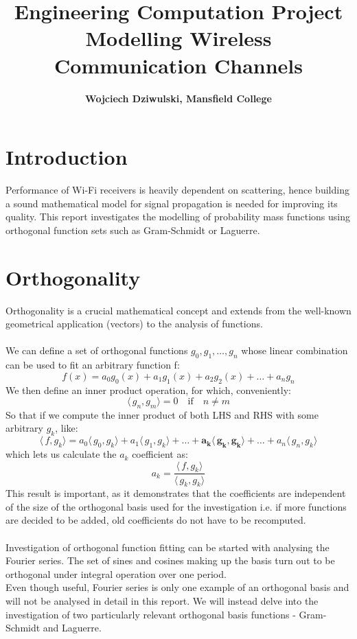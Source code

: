 \documentclass[a4paper]{article}
\title{Engineering Computation Project \\ \large Modelling Wireless Communication Channels}
\author{\textbf{Wojciech Dziwulski, Mansfield College}}
\date{}
\numberwithin{equation}{section}
\begin{document}
\maketitle

\section{Introduction}

Performance of Wi-Fi receivers is heavily dependent on scattering, hence building a sound mathematical model for signal propagation is needed for improving its quality. This report investigates the modelling of probability mass functions using orthogonal function sets such as Gram-Schmidt or Laguerre.

\section{Orthogonality}

Orthogonality is a crucial mathematical concept and extends from the well-known geometrical application (vectors) to the analysis of functions.
\\ \\
We can define a set of orthogonal functions $g_0, g_1, \ldots, g_n$ whose linear combination can be used to fit an arbitrary function f:
\begin{equation}f(x) = a_0 g_0(x)+a_1 g_1(x)+a_2 g_2(x)+\ldots+a_n g_n \end{equation}
\noindent We then define an inner product operation, for which, conveniently:
\begin{equation} \langle\,g_n,g_m\rangle = 0 \quad \textrm{if} \quad n \ne m \end{equation}
So that if we compute the inner product of both LHS and RHS with some arbitrary $g_k$, like:
\begin{equation} \langle\,f,g_k\rangle = a_0\langle\,g_0,g_k\rangle + a_1\langle\,g_1,g_k\rangle + \ldots + \boldsymbol{a_k\langle\,g_k,g_k\rangle} + \ldots + a_n\langle\,g_n,g_k\rangle \end{equation}
which lets us calculate the $a_k$ coefficient as:
\begin{equation} a_k = \frac {\langle\,f,g_k\rangle} {\langle\,g_k,g_k\rangle} \end{equation}
This result is important, as it demonstrates that the coefficients are independent of the size of the orthogonal basis used for the investigation i.e. if more functions are decided to be added, old coefficients do not have to be recomputed.
\\ \\
Investigation of orthogonal function fitting can be started with analysing the Fourier series. The set of sines and cosines making up the basis turn out to be orthogonal under integral operation over one period.
\\
Even though useful, Fourier series is only one example of an orthogonal basis and will not be analysed in detail in this report. We will instead delve into the investigation of two particularly relevant orthogonal basis functions - Gram-Schmidt and Laguerre.
\end{document}
